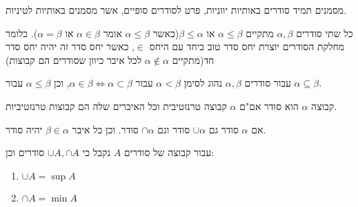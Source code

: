 \documentclass{tstextbook}
\begin{document}
\begin{symbolize}
מסמנים תמיד סודרים באותיות יווניות, פרט לסודרים סופיים, אשר מסמנים באותיות לטיניות.

\end{symbolize}
\begin{proposition}
כל שתי סודרים \(\alpha,\beta\) מתקיים \(\alpha \leq \beta\) או \(\beta \leq \alpha\)(כאשר \(\alpha \leq \beta\) אומר \(\alpha \in \beta\) או \(\alpha = \beta\)). כלומר מחלקת הסודרים יוצרת יחס סדר טוב ביחד עם היחס \(\in\), כאשר יחס סדר זה יהיה יחס סדר חד(מתקיים \(\alpha \not \in \alpha\) לכל איבר כיוון שסודרים הם קבוצות)

\end{proposition}
\begin{symbolize}
עבור סודרים \(\alpha,\beta\) נהוג לסימן \(\alpha<\beta\) עבור \(\alpha \in \beta \iff \alpha \subset \beta\), וכן \(\alpha \leq \beta\) עבור \(\alpha \subseteq \beta\). 

\end{symbolize}
\begin{proposition}
קבוצה \(\alpha\) הוא סודר אם"ם \(\alpha\) קבוצה טרנזטיבית וכל האיברים שלה הם קבוצות טרנזטיביות.

\end{proposition}
\begin{corollary}
אם \(\alpha\) סודר גם \(\cup \alpha\) סודר וגם \(\cap \alpha\) סודר. וכן כל איבר \(\beta \in \alpha\) יהיה סודר.

\end{corollary}
\begin{proposition}
עבור קבוצה של סודרים \(A\) נקבל כי \(\cup A,\cap A\) סודרים וכן:

  \begin{enumerate}
    \item \(\cup A=\sup A\)


    \item \(\cap A=\min A\)


  \end{enumerate}
\end{proposition}
\end{document}
